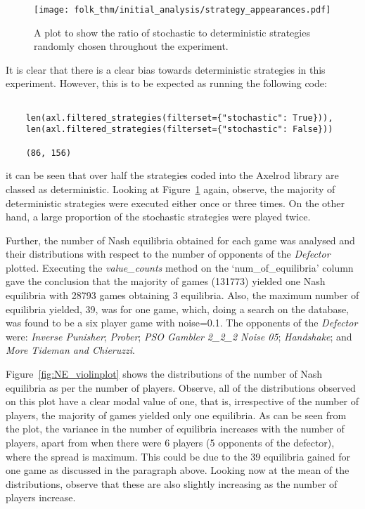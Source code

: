 \begin{figure}
    \centering
    \texttt{[image: folk\_thm/initial\_analysis/strategy\_appearances.pdf]}
    \caption{A plot to show the ratio of stochastic to deterministic strategies randomly chosen throughout the experiment.}\label{fig:stochastic_chart}
\end{figure}

It is clear that there is a clear bias towards deterministic strategies
in this experiment. However, this is to be expected as running the following
code:
\begin{verbatim}
    
    len(axl.filtered_strategies(filterset={"stochastic": True})), 
    len(axl.filtered_strategies(filterset={"stochastic": False}))

    (86, 156)
\end{verbatim}
it can be seen that over half the strategies coded into the Axelrod library are
classed as deterministic. Looking at Figure~\ref{fig:stochastic_chart} again,
observe, the majority of deterministic strategies were executed either once or
three times. On the other hand, a large proportion of the stochastic strategies
were played twice.

Further, the number of Nash equilibria obtained for each game was analysed and
their distributions with respect to the number of opponents of the
\textit{Defector} plotted. Executing the \textit{value\_counts} method on the
`num\_of\_equilibria' column gave the conclusion that the majority of games
(131773) yielded one Nash equilibria with 28793 games obtaining 3 equilibria.
Also, the maximum number of equilibria yielded, 39, was for one game, which,
doing a search on the database, was found to be a six player game with
noise=0.1. The opponents of the \textit{Defector} were: \textit{Inverse
Punisher}; \textit{Prober}; \textit{PSO Gambler 2\_2\_2 Noise 05};
\textit{Handshake}; and \textit{More Tideman and Chieruzzi}.

Figure~\ref{fig:NE_violinplot} shows the distributions of the number of Nash
equilibria as per the number of players. Observe, all of the distributions
observed on this plot have a clear modal value of one, that is, irrespective of
the number of players, the majority of games yielded only one equilibria. As can
be seen from the plot, the variance in the number of equilibria increases with
the number of players, apart from when there were 6 players (5 opponents of the
defector), where the spread is maximum. This could be due to the 39 equilibria
gained for one game as discussed in the paragraph above. Looking now at the mean
of the distributions, observe that these are also slightly increasing as the
number of players increase. 

